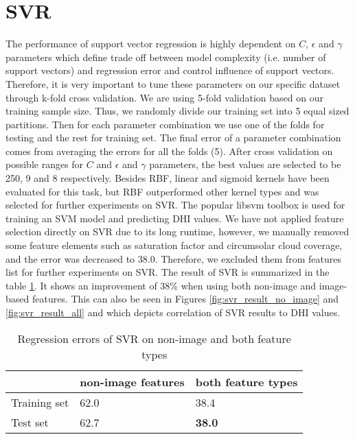 \section{SVR}
The performance of support vector regression is highly dependent on $C$, $\epsilon$ and $\gamma$ parameters which define trade off between model complexity (i.e. number of support vectors) and regression error and control influence of support vectors. Therefore, it is very important to tune these parameters on our specific dataset through k-fold cross validation. We are using 5-fold validation based on our training sample size. Thus, we randomly divide our training set into 5 equal sized partitions. Then for each parameter combination we use one of the folds for testing and the rest for training set. The final error of a parameter combination comes from averaging the errors for all the folds (5). After cross validation on possible ranges for $C$ and $\epsilon$  and $\gamma$ parameters, the best values are selected to be 250, 9 and 8 respectively. Besides RBF, linear and sigmoid kernels have been evaluated for this task, but RBF outperformed other kernel types and was selected for further experiments on SVR. The popular libsvm toolbox is used for training an SVM model and predicting DHI values. We have not applied feature selection directly on SVR due to its long runtime, however, we manually removed some feature elements such as saturation factor and circumsolar cloud coverage, and the error was decreased to 38.0. Therefore, we excluded them from features list for further experiments on SVR.\newline
The result of SVR is summarized in the table \ref{table:rmse_svr}. It shows an improvement of 38\% when using both non-image and image-based features. This can also be seen in Figures \ref{fig:svr_result_no_image} and \ref{fig:svr_result_all} and which depicts correlation of SVR results to DHI values.

\begin{table}[h!]
\centering
\begin{tabular}{ |p{2.5cm}||p{4cm}|p{4cm}|  }
 \hline
 &non-image features& both feature types\\
 \hline
 Training set &   62.0  & 38.4 \\
 Test set&   62.7  & \textbf{38.0} \\
 \hline
\end{tabular}
\caption{Regression errors of SVR on non-image and both feature types}
\label{table:rmse_svr}
\end{table}

